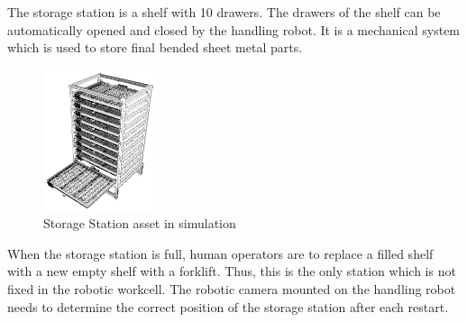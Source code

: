 The storage station is a shelf with 10 drawers. The drawers of the shelf can be automatically opened and closed by the
handling robot. It is a mechanical system which is used to store final bended sheet metal parts.

\begin{figure}[h]
    \centering
    \includegraphics[width=0.3\textwidth]{figures/storage-station-blender.png}
    \caption{Storage Station asset in simulation}
    \label{fig:storage-station}
\end{figure}

When the storage station is full, human operators are to replace a filled shelf with a new empty shelf with a forklift. Thus, this is the only station
which is not fixed in the robotic workcell. The robotic camera mounted on the handling robot needs to determine the correct position of the storage station
after each restart.
